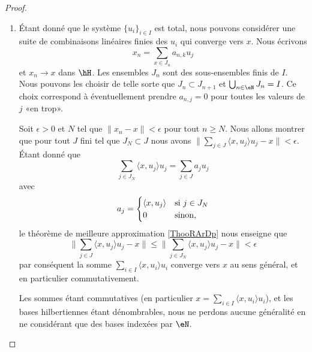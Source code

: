\begin{proof}
    \begin{enumerate}
        \item
            Étant donné que le système \( \{ u_i \}_{i\in I}\) est total, nous pouvons considérer une suite de combinaisons linéaires finies des \( u_i\) qui converge vers \( x\). Nous écrivons
            \begin{equation}
                x_n=\sum_{x\in J_n}a_{n,k}u_j
            \end{equation}
            et \( x_n\to x\) dans \( \hH\). Les ensembles \( J_n\) sont des sous-ensembles finis de \( I\). Nous pouvons les choisir de telle sorte que \( J_n\subset J_{n+1}\) et \( \bigcup_{n\in \eN}J_n=I\). Ce choix correspond à éventuellement prendre \( a_{n,j}=0\) pour toutes les valeurs de \( j\) «en trop».

            Soit \( \epsilon>0\) et \( N\) tel que \( \| x_n-x \|<\epsilon\) pour tout \( n\geq N\). Nous allons montrer que pour tout \( J\) fini tel que \( J_N\subset J\) nous avons \( \| \sum_{j\in J}\langle x, u_j\rangle u_j-x \|<\epsilon\). Étant donné que
            \begin{equation}
                \sum_{j\in J_N}\langle x, u_j\rangle u_j=\sum_{j\in J}a_ju_j
            \end{equation}
            avec
            \begin{equation}
                a_j=\begin{cases}
                    \langle x, u_j\rangle     &   \text{si \( j\in J_N\)}\\
                    0    &    \text{sinon},
                \end{cases}
            \end{equation}
            le théorème de meilleure approximation \ref{ThooRArDp} nous enseigne que
            \begin{equation}
                \| \sum_{j\in J}\langle x, u_j\rangle u_j-x \|\leq\| \sum_{j\in J_N}\langle x, u_j\rangle u_j-x \|<\epsilon
            \end{equation}
            par conséquent la somme \( \sum_{i\in I}\langle x, u_i\rangle u_i\) converge vers \( x\) au sens général, et en particulier commutativement.

    Les sommes étant commutatives (en particulier \( x=\sum_{i\in I}\langle x, u_i\rangle u_i\)), et les bases hilbertiennes étant dénombrables, nous ne perdons aucune généralité en ne considérant que des bases indexées par \( \eN\).


\end{enumerate}
\end{proof}

